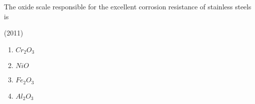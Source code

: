     \item The oxide scale responsible for the excellent corrosion resistance of stainless steels is
    
    \hfill{(2011)}

        \begin{multicols}{4}
            \begin{enumerate}
                \item $Cr_2O_3$
                \item $NiO$
                \item $Fe_2O_3$
                \item $Al_2O_3$
            \end{enumerate}
        \end{multicols}


